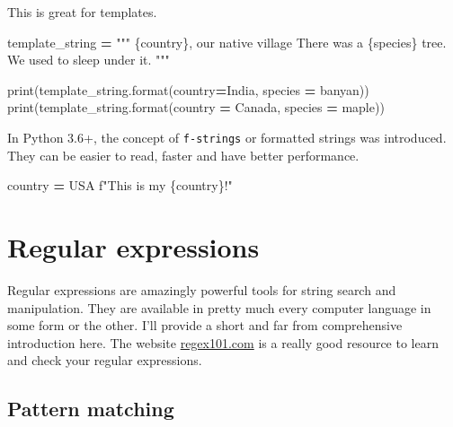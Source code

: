\documentclass[
  letterpaper,
]{scrbook}
\newenvironment{Shaded}{\begin{snugshade}}{\end{snugshade}}
\newcommand{\BuiltInTok}[1]{#1}
\newcommand{\NormalTok}[1]{#1}
\newcommand{\OperatorTok}[1]{\textcolor[rgb]{0.81,0.36,0.00}{\textbf{#1}}}
\newcommand{\SpecialCharTok}[1]{\textcolor[rgb]{0.00,0.00,0.00}{#1}}
\newcommand{\SpecialStringTok}[1]{\textcolor[rgb]{0.31,0.60,0.02}{#1}}
\newcommand{\StringTok}[1]{\textcolor[rgb]{0.31,0.60,0.02}{#1}}
\begin{document}
This is great for templates.

\begin{Shaded}
\begin{Highlighting}[]
\NormalTok{template\_string }\OperatorTok{=} \StringTok{"""}
\SpecialCharTok{\{country\}}\StringTok{, our native village}
\StringTok{There was a }\SpecialCharTok{\{species\}}\StringTok{ tree.}
\StringTok{We used to sleep under it.}
\StringTok{"""}

\BuiltInTok{print}\NormalTok{(template\_string.}\BuiltInTok{format}\NormalTok{(country}\OperatorTok{=}\StringTok{\textquotesingle{}India\textquotesingle{}}\NormalTok{, species }\OperatorTok{=} \StringTok{\textquotesingle{}banyan\textquotesingle{}}\NormalTok{))}
\BuiltInTok{print}\NormalTok{(template\_string.}\BuiltInTok{format}\NormalTok{(country }\OperatorTok{=} \StringTok{\textquotesingle{}Canada\textquotesingle{}}\NormalTok{, species }\OperatorTok{=} \StringTok{\textquotesingle{}maple\textquotesingle{}}\NormalTok{))}
\end{Highlighting}
\end{Shaded}

In Python 3.6+, the concept of \texttt{f-strings} or formatted strings was introduced. They can be easier to read, faster and have better performance.

\begin{Shaded}
\begin{Highlighting}[]
\NormalTok{country }\OperatorTok{=} \StringTok{\textquotesingle{}USA\textquotesingle{}}
\SpecialStringTok{f"This is my }\SpecialCharTok{\{}\NormalTok{country}\SpecialCharTok{\}}\SpecialStringTok{!"}
\end{Highlighting}
\end{Shaded}

\hypertarget{regular-expressions}{%
\section{Regular expressions}\label{regular-expressions}}

Regular expressions are amazingly powerful tools for string search and manipulation. They are available in pretty much every
computer language in some form or the other. I'll provide a short and far from comprehensive introduction here. The website \href{https://regex101.com}{regex101.com} is a really good resource to learn and check your regular expressions.

\hypertarget{pattern-matching}{%
\subsection{Pattern matching}\label{pattern-matching}}
\end{document}
